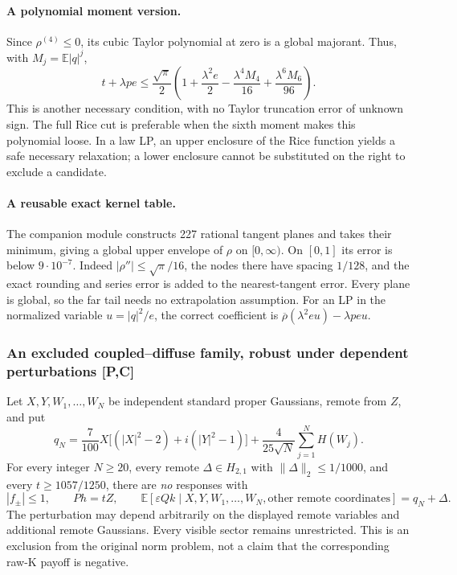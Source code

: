 \paragraph{A polynomial moment version.}
Since $\rho^{(4)}\le0$, its cubic Taylor polynomial at zero is a global
majorant. Thus, with $M_j=\mathbb E|q|^j$,
\begin{equation}\label{eq:remote-moment-feasibility}
 t+\lambda pe\le\frac{\sqrt\pi}{2}
 \left(1+\frac{\lambda^2e}{2}
       -\frac{\lambda^4M_4}{16}
       +\frac{\lambda^6M_6}{96}\right).
\end{equation}
This is another necessary condition, with no Taylor truncation error of
unknown sign. The full Rice cut is preferable when the sixth moment makes
this polynomial loose. In a law LP, an upper enclosure of the Rice
function yields a safe necessary relaxation; a lower enclosure cannot
be substituted on the right to exclude a candidate.

\paragraph{A reusable exact kernel table.}
The companion module constructs 227 rational tangent planes and takes
their minimum, giving a global upper envelope of $\rho$ on $[0,\infty)$.
On $[0,1]$ its error is below $9\cdot10^{-7}$. Indeed
$|\rho''|\le\sqrt\pi/16$, the nodes there have spacing $1/128$, and
the exact rounding and series error is added to the nearest-tangent
error. Every plane is global, so the far tail needs no extrapolation
assumption. For an LP in the normalized variable $u=|q|^2/e$, the
correct coefficient is $\overline\rho(\lambda^2 e u)-\lambda peu$.

\subsubsection{An excluded coupled--diffuse family, robust under dependent perturbations [P,C]}
Let $X,Y,W_1,\ldots,W_N$ be independent standard proper Gaussians, remote
from $Z$, and put
\[
 q_N=\frac7{100}X\bigl[(|X|^2-2)+i(|Y|^2-1)\bigr]
       +\frac4{25\sqrt N}\sum_{j=1}^N H(W_j).
\]
For every integer $N\ge20$, every remote $\Delta\in H_{2,1}$ with
$\|\Delta\|_2\le1/1000$, and every $t\ge1057/1250$, there are
\emph{no} responses with
\[
 |f_\pm|\le1,\qquad Ph=tZ,\qquad
 \mathbb E[\varepsilon Qk\mid X,Y,W_1,\ldots,W_N,\text{other remote coordinates}]
       =q_N+\Delta.
\]
The perturbation may depend arbitrarily on the displayed remote
variables and additional remote Gaussians. Every visible sector remains
unrestricted. This is an exclusion from the original norm problem,
not a claim that the corresponding raw-K payoff is negative.

